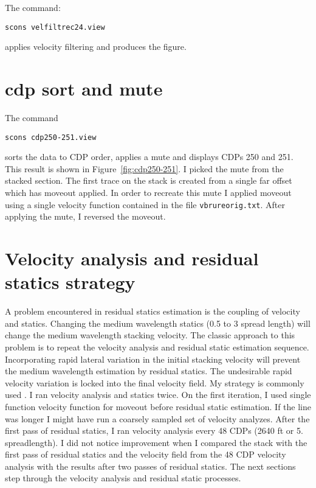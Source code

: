 The command:
\begin{verbatim}
scons velfiltrec24.view 
\end{verbatim}
applies velocity filtering and produces the figure.


\section{cdp sort and mute}

The command
\begin{verbatim}
scons cdp250-251.view 
\end{verbatim}
sorts the data to CDP order, applies a mute and displays CDPs 250 and 
251.  This result is shown in Figure~\ref{fig:cdp250-251}.  I picked 
the mute from the stacked section.  The first trace on the stack is 
created from a single far offset which has moveout applied.  
In order to recreate this mute I applied moveout using a single velocity 
function contained in the file \texttt{vbrureorig.txt}. After applying the mute, 
I reversed the moveout.

\section{Velocity analysis and residual statics strategy}
A problem encountered in residual statics estimation is the coupling of 
velocity and statics.  Changing the medium wavelength statics (0.5 to 3 
spread length) will change the medium wavelength stacking velocity.  
The classic approach to this problem is to repeat the velocity analysis 
and residual static estimation sequence.  Incorporating rapid lateral 
variation in the initial stacking velocity will prevent the medium wavelength 
estimation by residual statics.  The undesirable rapid velocity variation 
is locked into the final velocity field.  My strategy is 
commonly used \cite[]{SCS00-00-00010531}.  I ran velocity analysis and statics twice.  On the first 
iteration, I used single function velocity function for moveout before 
residual static estimation.  If the line was longer I might have run
a coarsely sampled set of velocity analyzes. After the first 
pass of residual statics,  I ran velocity analysis every 48 CDPs (2640 ft 
or 5. spreadlength).  I did not notice improvement when I compared the 
stack with the first pass of residual statics and the velocity field from 
the 48 CDP velocity analysis with the results after two passes of residual 
statics.  The next sections step through the velocity analysis and residual 
static processes.

